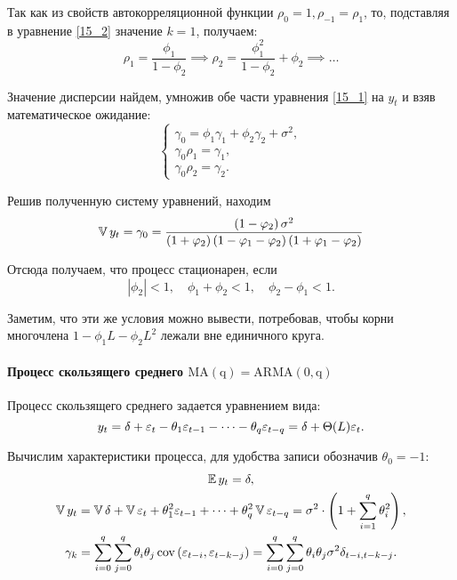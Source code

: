 Так как из свойств автокорреляционной функции $\rho_0 = 1, \rho_{-1} = \rho_{1}$, то, подставляя в уравнение \eqref{15_2} значение $k=1$, получаем:
\begin{equation*}
    \rho_1 = \frac{\phi_1}{1 - \phi_2}
    \implies
    \rho_2 = \frac{\phi_1^2}{1 - \phi_2} + \phi_2
    \implies
    \dots
\end{equation*}

Значение дисперсии найдем, умножив обе части уравнения \eqref{15_1} на $y_t$ и взяв математическое ожидание:
\begin{equation*}
    \begin{cases}
        \gamma_0 = \phi_1 \gamma_1 + \phi_2 \gamma_2 + \sigma^2,\\
        \gamma_0 \rho_1 = \gamma_1,\\
        \gamma_0 \rho_2 = \gamma_2.
    \end{cases}
\end{equation*}

Решив полученную систему уравнений, находим
\begin{equation*}
    \operatorname{\mathbb{V}} y_t = \gamma_0 = \frac{\left( 1 - \varphi_2 \right) \sigma^2}{\left( 1 + \varphi_2 \right) \left( 1 - \varphi_1 - \varphi_2 \right) \left( 1 + \varphi_1 - \varphi_2 \right)}
\end{equation*}

Отсюда получаем, что процесс стационарен, если
\begin{equation*}
    |\phi_2| < 1, \quad
    \phi_1 + \phi_2 < 1, \quad
    \phi_2 - \phi_1 < 1.
\end{equation*}

Заметим, что эти же условия можно вывести, потребовав, чтобы корни многочлена $1 - \phi_1 L - \phi_2 L^2$ лежали вне единичного круга.

\paragraph{Процесс скользящего среднего $\mathrm{MA\left( q \right) = \mathrm{ARMA}\left( 0, q \right)}$}

Процесс скользящего среднего задается уравнением вида:
\begin{equation*}
    y_t =
    \delta + \varepsilon_t - \theta_1 \varepsilon_{t-1} - \dots - \theta_q \varepsilon_{t-q} =
    \delta + \Theta(L) \varepsilon_t.
\end{equation*}

Вычислим характеристики процесса, для удобства записи обозначив $\theta_0 = -1$:
\begin{gather*}
    \operatorname{\mathbb{E}} y_t = \delta,\\
    \operatorname{\mathbb{V}} y_t = \operatorname{\mathbb{V}} \delta + \operatorname{\mathbb{V}} \varepsilon_t + \theta_1^2 \varepsilon_{t-1} + \dots + \theta_q^2 \operatorname{\mathbb{V}} \varepsilon_{t-q} = \sigma^2 \cdot \left( 1 + \sum_{i=1}^{q} \theta_i^2 \right),\\
    \gamma_k =
    \sum_{i=0}^{q} \sum_{j=0}^{q} \theta_i \theta_j \operatorname{cov}\left( \varepsilon_{t-i}, \varepsilon_{t-k-j} \right) =
    \sum_{i=0}^{q} \sum_{j=0}^{q} \theta_i \theta_j \sigma^2 \delta_{t-i, t-k-j}.
\end{gather*}

